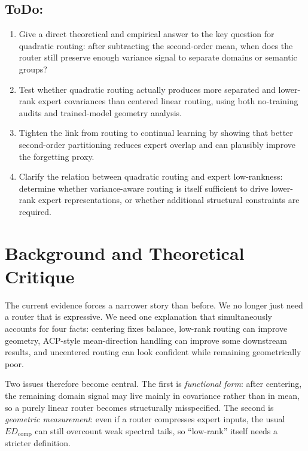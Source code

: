 \documentclass[11pt]{article}
\newcommand{\idea}[1]{\textcolor{red}{[#1]}}
\begin{document}
\subsection{ToDo:}
\begin{enumerate}
    \item Give a direct theoretical and empirical answer to the key question for quadratic routing: after subtracting the second-order mean, when does the router still preserve enough variance signal to separate domains or semantic groups?
    \item Test whether quadratic routing actually produces more separated and lower-rank expert covariances than centered linear routing, using both no-training audits and trained-model geometry analysis.
    \item Tighten the link from routing to continual learning by showing that better second-order partitioning reduces expert overlap and can plausibly improve the forgetting proxy.
    \item Clarify the relation between quadratic routing and expert low-rankness: determine whether variance-aware routing is itself sufficient to drive lower-rank expert representations, or whether additional structural constraints are required.
\end{enumerate}

\section{Background and Theoretical Critique}



The current evidence forces a narrower story than before. We no longer just need a router that is expressive. We need one explanation that simultaneously accounts for four facts: centering fixes balance, low-rank routing can improve geometry, ACP-style mean-direction handling can improve some downstream results, and uncentered routing can look confident while remaining geometrically poor.

Two issues therefore become central. The first is \emph{functional form}: after centering, the remaining domain signal may live mainly in covariance rather than in mean, so a purely linear router becomes structurally misspecified. The second is \emph{geometric measurement}: even if a router compresses expert inputs, the usual $ED_{\mathrm{comp}}$ can still overcount weak spectral tails, so ``low-rank'' itself needs a stricter definition.
\end{document}
